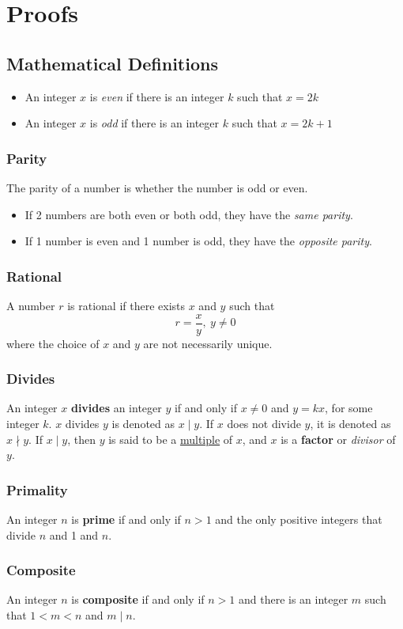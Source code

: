 \section{Proofs}
\subsection{Mathematical Definitions}
\begin{itemize}
  \item An integer $x$ is \textit{even} if there is an integer $k$ such that $x=2k$
  \item An integer $x$ is \textit{odd} if there is an integer $k$ such that $x=2k+1$
\end{itemize}
\subsubsection*{Parity}
The parity of a number is whether the number is odd or even.
\begin{itemize}
  \item If 2 numbers are both even or both odd, they have the \textit{same parity}.
  \item If 1 number is even and 1 number is odd, they have the \textit{opposite parity}.
\end{itemize}
\subsubsection*{Rational}
A number $r$ is rational if there exists $x$ and $y$ such that
\[
  r=\frac{x}{y},~y \not = 0
\]
where the choice of $x$ and $y$ are not necessarily unique.
\subsubsection*{Divides}
An integer $x$ \textbf{divides} an integer $y$ if and only if $x\not =0$ and $y = kx$,
for some integer $k$. $x$ divides $y$ is denoted as $x \mid  y$.
If $x$ does not divide $y$, it is denoted as $x \nmid y$.
If $x \mid y$, then $y$ is said to be a \underline{multiple} of $x$,
and $x$ is a \textbf{factor} or \textit{divisor} of $y$.
\subsubsection*{Primality}
An integer $n$ is \textbf{prime} if and only if $n > 1$ and the only positive integers
that divide $n$ and 1 and $n$.
\subsubsection*{Composite}
An integer $n$ is \textbf{composite} if and only if $n > 1$ and there is an integer $m$
such that $1 < m < n$ and $m \mid n$.
